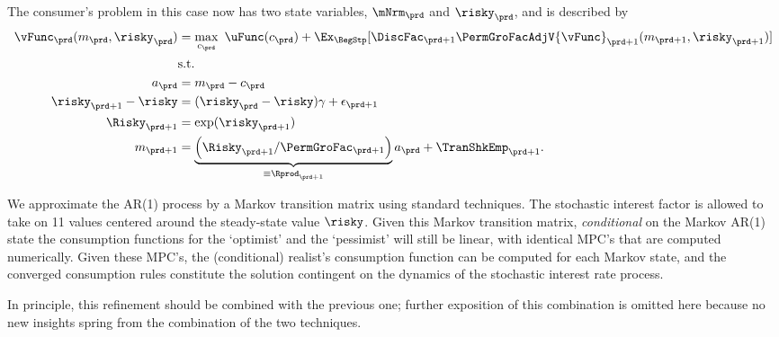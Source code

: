 \documentclass[\econtexRoot/SolvingMicroDSOPs]{subfiles}
\begin{document}
The consumer's problem in this case now has two state variables, $\mNrm_{\prd}$ and $\risky_{\prd}$, and
is described by
\begin{equation}\begin{gathered}\begin{aligned}
      \vFunc_{\prd}(m_{\prd},\risky_{\prd})  & = \max_{{c}_{\prd}} ~ \uFunc(c_{\prd})+
      \Ex_{\BegStp}[{\DiscFac}_{\prd+1}\PermGroFacAdjV{\vFunc}_{\prd+1}(m_{\prd+1},\risky_{\prd+1})] \label{vNormedRisky}
      \\         & \text{s.t.}   \nonumber \\
      a_{\prd}    & = m_{\prd}-c_{\prd} \nonumber
      \\      \risky_{\prd+1}-\risky  & = (\risky_{\prd}-\risky)\gamma + \epsilon_{\prd+1} \notag
      \\      \Risky_{\prd+1}  & = \exp(\risky_{\prd+1}) \notag
      \\      m_{\prd+1}  & = \underbrace{\left(\Risky_{\prd+1}/\PermGroFac_{\prd+1}\right)}_{\equiv \Rprod_{\prd+1}}a_{\prd}+\TranShkEmp_{\prd+1} \nonumber.
    \end{aligned}\end{gathered}\end{equation}


We approximate the AR(1) process by a Markov transition matrix using standard techniques.  The stochastic interest factor is allowed to take
on 11 values centered around the steady-state value $\risky$.  Given this Markov transition matrix, \textit{conditional} on the Markov AR(1) state the consumption functions for the `optimist' and the `pessimist' will still be linear,
with identical MPC's that are computed numerically.  Given these MPC's, the (conditional) realist's consumption function can be computed for each Markov state, and the converged consumption rules constitute the solution contingent on the dynamics of the stochastic
interest rate process.

In principle, this refinement should be combined with the previous one;
further exposition of this combination is omitted here because no new
insights spring from the combination of the two techniques.



\hypertarget{imposing-artificial-borrowing-constraints}{}
\end{document}
